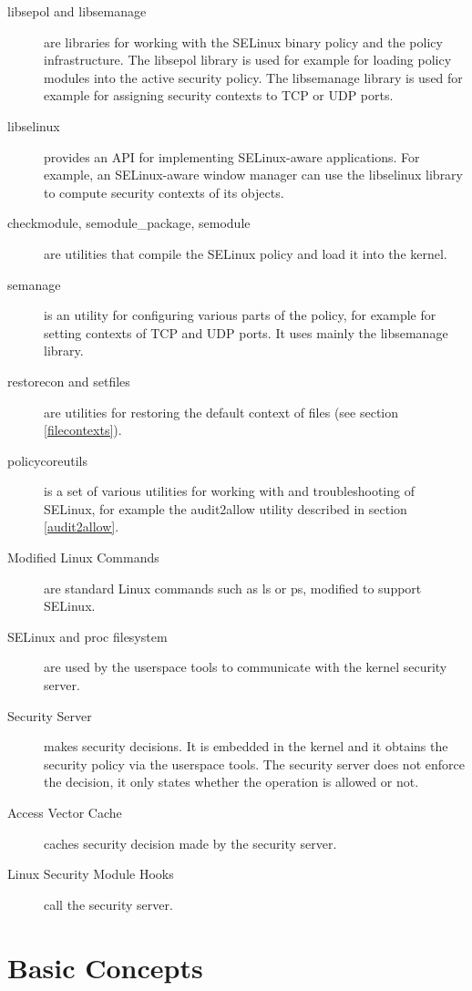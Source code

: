 \begin{description}
    \item [libsepol and libsemanage] are libraries for working with the SELinux
        binary policy and the policy infrastructure. The libsepol library is
        used for example for loading policy modules into the active security
        policy. The libsemanage library is used for example for assigning
        security contexts to TCP or UDP ports.
    \item [libselinux] provides an API for implementing SELinux-aware
        applications. For example, an SELinux-aware window manager can use the
        libselinux library to compute security contexts of its objects.
    \item [checkmodule, semodule\_package, semodule] are utilities that compile
        the SELinux policy and load it into the kernel.
    \item [semanage] is an utility for configuring various parts of the policy,
        for example for setting contexts of TCP and UDP ports. It uses mainly
        the libsemanage library.
    \item [restorecon and setfiles] are utilities for restoring the default
        context of files (see section \ref{filecontexts}).
    \item [policycoreutils] is a set of various utilities for working with and
        troubleshooting of SELinux, for example the audit2allow utility
        described in section \ref{audit2allow}.
    \item [Modified Linux Commands] are standard Linux commands such as ls or
        ps, modified to support SELinux.
    \item [SELinux and proc filesystem] are used by the userspace tools to
        communicate with the kernel security server.
    \item [Security Server] makes security decisions. It is embedded in the
        kernel and it obtains the security policy via the userspace tools.
        The security server does not enforce the decision, it only states
        whether the operation is allowed or not.
    \item [Access Vector Cache] caches security decision made by the security
        server.
    \item [Linux Security Module Hooks] call the security server.
\end{description}

\section{Basic Concepts}

